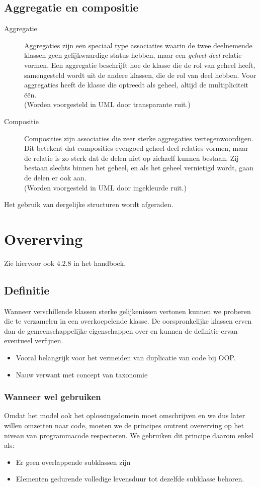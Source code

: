 \documentclass[../main.tex]{subfiles}
\begin{document}
\subsection{Aggregatie en compositie}
\begin{description}
	\item[Aggregatie] Aggregaties zijn een speciaal type associaties waarin de twee deelnemende klassen geen gelijkwaardige status hebben, maar een \textit{geheel-deel} relatie vormen. Een aggregatie beschrijft hoe de klasse die de rol van geheel heeft, samengesteld wordt uit de andere klassen, die de rol van deel hebben. Voor aggregaties heeft de klasse die optreedt als geheel, altijd de multipliciteit \"e\"en.\\
	(Worden voorgesteld in UML door transparante ruit.)
	\item[Compositie] Composities zijn associaties die zeer sterke aggregaties vertegenwoordigen. Dit betekent dat composities evengoed geheel-deel relaties vormen, maar de relatie is zo sterk dat de delen niet op zichzelf kunnen bestaan. Zij bestaan slechts binnen het geheel, en als het geheel vernietigd wordt, gaan de delen er ook aan.\\
	(Worden voorgesteld in UML door ingekleurde ruit.)
\end{description}
Het gebruik van dergelijke structuren wordt afgeraden.
\section{Overerving}
Zie hiervoor ook $4.2.8$ in het handboek.\\
\subsection{Definitie}
Wanneer verschillende klassen sterke gelijkenissen vertonen kunnen we proberen die te verzamelen in een overkoepelende klasse. De oorspronkelijke klassen erven dan de gemeenschappelijke eigenschappen over en kunnen de definitie ervan eventueel verfijnen.
\begin{itemize}
	\item Vooral belangrijk voor het vermeiden van duplicatie van code bij OOP.
	\item Nauw verwant met concept van taxonomie
\end{itemize}
\subsubsection{Wanneer wel gebruiken}
Omdat het model ook het oplossingsdomein moet omschrijven en we dus later willen omzetten naar code, moeten we de principes omtrent overerving op het niveau van programmacode respecteren.  We gebruiken dit principe daarom enkel als:
\begin{itemize}
	\item Er geen overlappende subklassen zijn
	\item Elementen gedurende volledige levensduur tot dezelfde subklasse behoren.
\end{itemize}
\end{document}
